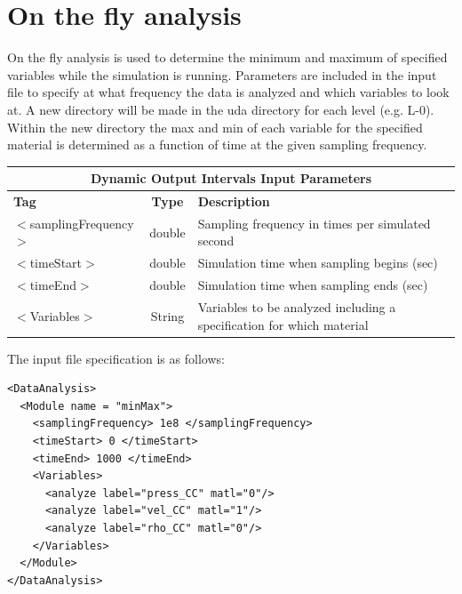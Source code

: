 \section{On the fly analysis}
On the fly analysis is used to determine the minimum and maximum of specified variables while the simulation is running.  Parameters are included in the input file to specify at what frequency the data is analyzed and which variables to look at. A new directory will be made in the uda directory for each level (e.g. L-0). Within the new directory the max and min of each variable for the specified material is determined as a function of time at the given sampling frequency.

\begin{center}
\begin{tabular}{| l | c | p{7cm} |}
\hline
  \multicolumn{3}{|c|}{\textbf{Dynamic Output Intervals Input Parameters}} \\
\hline
\hline
  \textbf{Tag} & \textbf{Type} & \textbf{Description}\\
\hline
  $<$samplingFrequency$>$ & double & Sampling frequency in times per simulated second\\
\hline
  $<$timeStart$>$ & double & Simulation time when sampling begins (sec)\\
\hline
  $<$timeEnd$>$ & double & Simulation time when sampling ends (sec)\\
\hline
  $<$Variables$>$ & String & Variables to be analyzed including a specification for which material\\
\hline
\end{tabular}
\end{center}


The input file specification is as follows:
\begin{verbatim}
<DataAnalysis>
  <Module name = "minMax">
    <samplingFrequency> 1e8 </samplingFrequency>
    <timeStart> 0 </timeStart>
    <timeEnd> 1000 </timeEnd>
    <Variables>
      <analyze label="press_CC" matl="0"/>
      <analyze label="vel_CC" matl="1"/>
      <analyze label="rho_CC" matl="0"/>
    </Variables>
  </Module>
</DataAnalysis>
\end{verbatim}



\newcommand{\xmltag}[1]{{\footnotesize\texttt{<#1>}}}
\newcommand{\xmltagH}[1]{\texttt{<#1>}}

